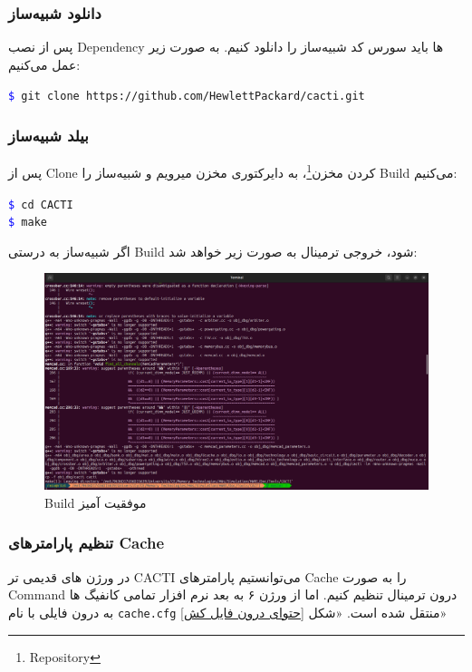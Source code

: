 \documentclass[12pt]{exam}
\begin{document}
\begin{questions}
\subsubsection{دانلود شبیه‌ساز}
پس از نصب Dependency ها باید سورس کد شبیه‌ساز را دانلود کنیم. به صورت زیر عمل می‌کنیم:\\

\begin{latin}
	\texttt{\textcolor{blue}{\$} git clone https://github.com/HewlettPackard/cacti.git}
\end{latin}



\subsubsection{بیلد شبیه‌ساز}
پس از Clone کردن مخزن\footnote{Repository}، به دایرکتوری مخزن میرویم و شبیه‌ساز را Build می‌کنیم: \\

\begin{latin}
	\texttt{\textcolor{blue}{\$} cd CACTI}\\
	\texttt{\textcolor{blue}{\$} make}
\end{latin}

اگر شبیه‌ساز به درستی Build شود، خروجی ترمینال به صورت زیر خواهد شد:

\begin{figure}[h]
	\centering
	\includegraphics[width=1\textwidth]{images/img3}
	\caption{Build موفقیت آمیز}
	\label{بیلد موفق ککتای}
\end{figure}


\subsubsection{تنظیم پارامتر‌های Cache}
در ورژن های قدیمی تر CACTI می‌توانستیم پارامتر‌های Cache را به صورت Command درون ترمینال تنظیم کنیم. اما از ورژن ۶ به بعد نرم افزار تمامی کانفیگ ها به درون فایلی با نام \texttt{cache.cfg} منتقل شده است. «شکل \textcolor{blue}{\ref{حتوای درون فایل کش}}»


\end{questions}
\end{document}
